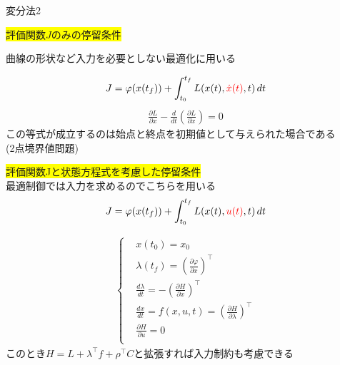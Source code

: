 \documentclass[twocolumn, dvipdfmx,12pt]{beamer}
\begin{document}
    \begin{frame}{変分法2}
        \fontsize{7.8pt}{7.8pt}\selectfont


        \begin{multicols}{2}
            \colorbox{yellow}{評価関数$J$のみの停留条件}\\
                
            \vspace{1em}

            曲線の形状など入力を必要としない最適化に用いる

            \begin{equation*}
                J =\varphi(x(t_f))+\int_{t_0}^{t_f} L(x(t), \textcolor{red}{\dot{x}(t)}, t) \, dt
            \end{equation*}
            \begin{align*}
                \frac{\partial L}{\partial x} - \frac{d}{dt} \left( \frac{\partial L}{\partial \dot{x}} \right) = 0
            \end{align*}
            この等式が成立するのは始点と終点を初期値として与えられた場合である\\
            (2点境界値問題)\\
            
            \columnbreak

            \colorbox{yellow}{評価関数Jと状態方程式を考慮した停留条件}\\
            \vspace{1em}
            最適制御では入力を求めるのでこちらを用いる
            \begin{equation*}
                J =\varphi(x(t_f))+\int_{t_0}^{t_f} L(x(t), \textcolor{red}{u(t)}, t) \, dt
            \end{equation*}

            \begin{align*}
                \begin{cases}
                    &x(t_0)=x_0 \\
                    &\lambda(t_f)=\left(\frac{\partial \varphi}{\partial x}\right)^\top \\
                    &\frac{d\lambda}{dt}=-\left(\frac{\partial H}{\partial x}\right)^\top\\
                    &\frac{dx}{dt}=f(x,u,t)=\left(\frac{\partial H}{\partial \lambda}\right)^\top \\
                    &\frac{\partial H}{\partial u}=0 \\
                \end{cases}
            \end{align*}
                このとき$H=L+\lambda ^\top f + \rho ^\top C$と拡張すれば入力制約も考慮できる
        \end{multicols}
                 
    \end{frame}
\end{document}
